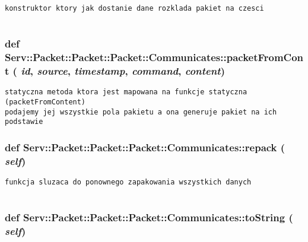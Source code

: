 \footnotesize\begin{verbatim}
konstruktor ktory jak dostanie dane rozklada pakiet na czesci
    
\end{verbatim}
\normalsize
 \hypertarget{class_serv_1_1_packet_1_1_packet_1_1_communicates_c2cd2b5c092a11d031baaa64ca9c17bb}{
\subsubsection[{packetFromCont}]{\setlength{\rightskip}{0pt plus 5cm}def Serv::Packet::Packet::Packet::Communicates::packetFromCont ( {\em id}, \/   {\em source}, \/   {\em timestamp}, \/   {\em command}, \/   {\em content})}}
\label{class_serv_1_1_packet_1_1_packet_1_1_communicates_c2cd2b5c092a11d031baaa64ca9c17bb}




\footnotesize\begin{verbatim}
statyczna metoda ktora jest mapowana na funkcje statyczna (packetFromContent)
podajemy jej wszystkie pola pakietu a ona generuje pakiet na ich podstawie

\end{verbatim}
\normalsize
 \hypertarget{class_serv_1_1_packet_1_1_packet_1_1_communicates_13619dd95f08e357d87ced2085312096}{
\subsubsection[{repack}]{\setlength{\rightskip}{0pt plus 5cm}def Serv::Packet::Packet::Packet::Communicates::repack ( {\em self})}}
\label{class_serv_1_1_packet_1_1_packet_1_1_communicates_13619dd95f08e357d87ced2085312096}




\footnotesize\begin{verbatim}
funkcja sluzaca do ponownego zapakowania wszystkich danych
    
\end{verbatim}
\normalsize
 \hypertarget{class_serv_1_1_packet_1_1_packet_1_1_communicates_67b541eba588d3eab311c64dc5575c3b}{
\subsubsection[{toString}]{\setlength{\rightskip}{0pt plus 5cm}def Serv::Packet::Packet::Packet::Communicates::toString ( {\em self})}}
\label{class_serv_1_1_packet_1_1_packet_1_1_communicates_67b541eba588d3eab311c64dc5575c3b}





